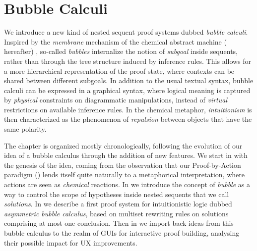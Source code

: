 \setchapterpreamble[u]{\margintoc}
\chapter{Bubble Calculi}

We introduce a new kind of nested sequent proof systems dubbed \emph{bubble
calculi}. Inspired by the \emph{membrane} mechanism of the chemical abstract
machine ({\cham} hereafter) , so-called
\emph{bubbles} internalize the notion of \emph{subgoal} inside sequents, rather
than through the tree structure induced by inference rules. This allows for a
more hierarchical representation of the proof state, where contexts can be
shared between different subgoals. In addition to the usual textual syntax,
bubble calculi can be expressed in a graphical syntax, where logical meaning is
captured by \emph{physical} constraints on diagrammatic manipulations, instead
of \emph{virtual} restrictions on available inference rules. In the chemical
metaphor, \emph{intuitionism} is then characterized as the phenomenon of
\emph{repulsion} between objects that have the same polarity.

The chapter is organized mostly chronologically, following the evolution of our
idea of a bubble calculus through the addition of new features. We start in
 with the genesis of the idea, coming from the observation that
our Proof-by-Action paradigm () lends itself quite naturally to a
metaphorical interpretation, where actions are seen as \emph{chemical}
reactions. In  we introduce the concept of \emph{bubble} as a
way to control the scope of hypotheses inside nested sequents that we call
\emph{solutions}. In  we describe a first proof system for
intuitionistic logic dubbed \emph{asymmetric bubble calculus}, based on multiset
rewriting rules on solutions comprising at most one conclusion. Then in
 we import back ideas from this bubble calculus to the realm
of GUIs for interactive proof building, analysing their possible impact for UX
improvements.


